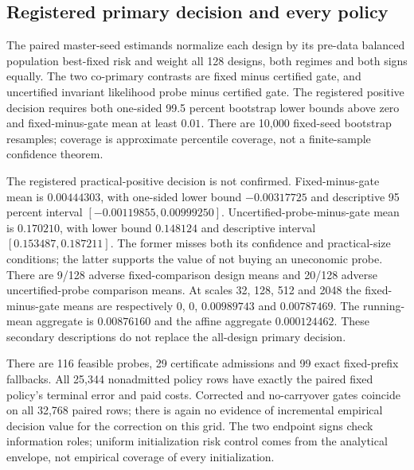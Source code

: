 \subsection{Registered primary decision and every policy}
The paired master-seed estimands normalize each design by its pre-data balanced population best-fixed risk and weight all 128 designs, both regimes and both signs equally.
The two co-primary contrasts are fixed minus certified gate, and uncertified invariant likelihood probe minus certified gate.
The registered positive decision requires both one-sided 99.5 percent bootstrap lower bounds above zero and fixed-minus-gate mean at least $0.01$.
There are 10,000 fixed-seed bootstrap resamples; coverage is approximate percentile coverage, not a finite-sample confidence theorem.

The registered practical-positive decision is not confirmed.
Fixed-minus-gate mean is $0.00444303$, with one-sided lower bound $-0.00317725$ and descriptive 95 percent interval $[-0.00119855,0.00999250]$.
Uncertified-probe-minus-gate mean is $0.170210$, with lower bound $0.148124$ and descriptive interval $[0.153487,0.187211]$.
The former misses both its confidence and practical-size conditions; the latter supports the value of not buying an uneconomic probe.
There are 9/128 adverse fixed-comparison design means and 20/128 adverse uncertified-probe comparison means.
At scales 32, 128, 512 and 2048 the fixed-minus-gate means are respectively $0$, $0$, $0.00989743$ and $0.00787469$.
The running-mean aggregate is $0.00876160$ and the affine aggregate $0.000124462$.
These secondary descriptions do not replace the all-design primary decision.

There are 116 feasible probes, 29 certificate admissions and 99 exact fixed-prefix fallbacks.
All 25,344 nonadmitted policy rows have exactly the paired fixed policy's terminal error and paid costs.
Corrected and no-carryover gates coincide on all 32,768 paired rows; there is again no evidence of incremental empirical decision value for the correction on this grid.
The two endpoint signs check information roles; uniform initialization risk control comes from the analytical envelope, not empirical coverage of every initialization.

